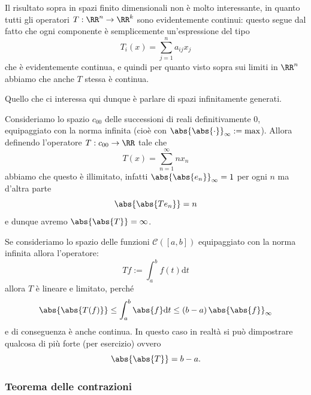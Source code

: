 \documentclass[11pt]{scrartcl}
\newcommand{\dif}{\text{d}}
\begin{document}
	\begin{remark}
		Il risultato sopra in spazi finito dimensionali non è molto interessante, in quanto tutti gli operatori $T:\RR^n\to\RR^k$ sono evidentemente continui: questo segue dal fatto che ogni componente è semplicemente un'espressione del tipo
		$$T_i(x)=\sum_{j=1}^{n}a_{ij}x_j$$
		che è evidentemente continua, e quindi per quanto visto sopra sui limiti in $\RR^n$ abbiamo che anche $T$ stessa è continua.
	\end{remark}
	Quello che ci interessa qui dunque è parlare di spazi infinitamente generati. 
	\begin{example}
		Consideriamo lo spazio $c_{00}$ delle successioni di reali definitivamente $0$, equipaggiato con la norma infinita (cioè con $\abs{\abs{\cdot}}_\infty:=\max$). Allora definendo l'operatore $T:c_{00}\to\RR$ tale che
		$$T(x)=\sum_{n=1}^{\infty}nx_n$$
		abbiamo che questo è illimitato, infatti $\abs{\abs{e_n}}_{\infty}=1$ per ogni $n$ ma d'altra parte
		$$\abs{\abs{Te_n}}=n$$
		e dunque avremo $\abs{\abs{T}}=\infty$.
	\end{example}
	\begin{example}
		Se consideriamo lo spazio delle funzioni $\mathcal{C}([a,b])$ equipaggiato con la norma infinita allora l'operatore:
		$$Tf:=\int_a^b f(t)\dif t$$
		allora $T$ è lineare e limitato, perché
		$$\abs{\abs{T(f)}}\le \int_a^b \abs{f}\dif t \le \left(b-a\right)\abs{\abs{f}}_\infty$$
		e di conseguenza è anche continua. In questo caso in realtà si può dimpostrare qualcosa di più forte (per esercizio) ovvero 
		$$\abs{\abs{T}}=b-a.$$
	\end{example}
	
	\subsubsection{Teorema delle contrazioni}
	
\end{document}
